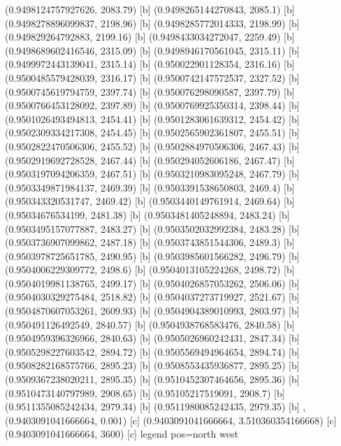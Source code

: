 {{{(0.9498124757927626, 2083.79) [b] 
(0.9498265144270843, 2085.1) [b] 
(0.9498278896099837, 2198.96) [b] 
(0.9498285772014333, 2198.99) [b] 
(0.949829264792883, 2199.16) [b] 
(0.9498433034272047, 2259.49) [b] 
(0.9498689602416546, 2315.09) [b] 
(0.9498946170561045, 2315.11) [b] 
(0.9499972443139041, 2315.14) [b] 
(0.950022901128354, 2316.16) [b] 
(0.9500485579428039, 2316.17) [b] 
(0.9500742147572537, 2327.52) [b] 
(0.9500745619794759, 2397.74) [b] 
(0.950076298090587, 2397.79) [b] 
(0.9500766453128092, 2397.89) [b] 
(0.9500769925350314, 2398.44) [b] 
(0.9501026493494813, 2454.41) [b] 
(0.9501283061639312, 2454.42) [b] 
(0.9502309334217308, 2454.45) [b] 
(0.9502565902361807, 2455.51) [b] 
(0.9502822470506306, 2455.52) [b] 
(0.9502884970506306, 2467.43) [b] 
(0.9502919692728528, 2467.44) [b] 
(0.950294052606186, 2467.47) [b] 
(0.9503197094206359, 2467.51) [b] 
(0.9503210983095248, 2467.79) [b] 
(0.9503349871984137, 2469.39) [b] 
(0.9503391538650803, 2469.4) [b] 
(0.950343320531747, 2469.42) [b] 
(0.9503440149761914, 2469.64) [b] 
(0.95034676534199, 2481.38) [b] 
(0.9503481405248894, 2483.24) [b] 
(0.9503495157077887, 2483.27) [b] 
(0.9503502032992384, 2483.28) [b] 
(0.9503736907099862, 2487.18) [b] 
(0.9503743851544306, 2489.3) [b] 
(0.9503978725651785, 2490.95) [b] 
(0.9503985601566282, 2496.79) [b] 
(0.9504006229309772, 2498.6) [b] 
(0.9504013105224268, 2498.72) [b] 
(0.9504019981138765, 2499.17) [b] 
(0.9504026857053262, 2506.06) [b] 
(0.9504030329275484, 2518.82) [b] 
(0.9504037273719927, 2521.67) [b] 
(0.9504870607053261, 2609.93) [b] 
(0.9504904389010993, 2803.97) [b] 
(0.950491126492549, 2840.57) [b] 
(0.9504938768583476, 2840.58) [b] 
(0.9504959396326966, 2840.63) [b] 
(0.9505026960242431, 2847.34) [b] 
(0.9505298227603542, 2894.72) [b] 
(0.9505569494964654, 2894.74) [b] 
(0.9508282168575766, 2895.23) [b] 
(0.9508553435936877, 2895.25) [b] 
(0.9509367238020211, 2895.35) [b] 
(0.9510452307464656, 2895.36) [b] 
(0.9510473140797989, 2908.65) [b] 
(0.95105217519091, 2908.7) [b] 
(0.9511355085242434, 2979.34) [b] 
(0.9511980085242435, 2979.35) [b] 
},{(0.9403091041666664, 0.001) [c] 
(0.9403091041666664, 3.510360354166668) [c] 
(0.9403091041666664, 3600) [c] 
}}}{legend pos=north west}